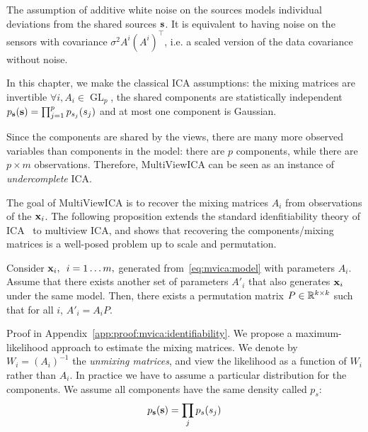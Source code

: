 \documentclass{report}
\DeclareMathOperator{\GL}{GL}
\begin{document}
The assumption of additive white noise on the sources models individual deviations from the shared sources $\mathbf{s}$.
It is equivalent to having noise on the sensors with covariance $\sigma^2 A^i \left(A^i\right)^{\top}$, i.e. a scaled version of the data covariance without noise.

In this chapter, we make the classical ICA assumptions: the mixing matrices are invertible $\forall i, A_i \in \GL_p$, the shared components are
statistically independent $p_{\mathbf{s}}(\mathbf{s}) = \prod_{j=1}^p p_{s_j}(s_j)$ and at most one component is Gaussian. 

Since the components are shared by the views, there are many more observed variables than components in the model: there are $p$ components, while there are $p \times m$ observations.
Therefore, MultiViewICA can be seen as an instance of \emph{undercomplete} ICA.
%

The goal of MultiViewICA is to recover the mixing matrices $A_i$ from observations of the $\mathbf{x}_i$.
The following proposition extends the standard idenfitiability theory of ICA~\cite{comon1994independent} to multiview ICA, and shows that recovering the components/mixing matrices is a well-posed problem up to scale and permutation.
%
\begin{proposition}
\label{prop:identifiability}
Consider $\mathbf{x}_i, \enspace i=1\dots m,$ generated from~\eqref{eq:mvica:model}
with parameters $A_i$. Assume that there exists another set of parameters
$A'_i$ that also generates $\mathbf{x}_i$ under the same model.
Then, there exists a permutation matrix $P\in \mathbb{R}^{k\times k}$ such that for all $i$, $A'_i = A_i P$.
\end{proposition}
Proof in Appendix~\ref{app:proof:mvica:identifiability}.
%
%
%
%
%
%
%
We propose a maximum-likelihood approach to estimate the mixing matrices. 
We denote by $W_i = (A_i)^{-1}$ the \emph{unmixing matrices}, and view the
likelihood as a function of $W_i$ rather than $A_i$.
In practice we have to assume a particular distribution for the components. We
assume all components have the same density called $p_s$:
\[
  p_{\mathbf{s}}(\mathbf{s}) = \prod_j p_s(s_j)
\]
\end{document}
